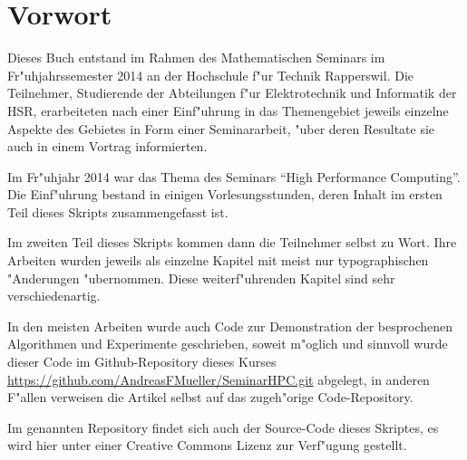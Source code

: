 \chapter*{Vorwort}
Dieses Buch entstand im Rahmen des Mathematischen Seminars
im Fr"uhjahrssemester 2014 an der Hochschule f"ur Technik Rapperswil.
Die Teilnehmer, Studierende der Abteilungen f"ur Elektrotechnik und
Informatik der
HSR, erarbeiteten nach einer Einf"uhrung in das Themengebiet jeweils
einzelne Aspekte des Gebietes in Form einer Seminararbeit, "uber
deren Resultate sie auch in einem Vortrag informierten. 

Im Fr"uhjahr 2014 war das Thema des Seminars ``High Performance Computing''.
Die Einf"uhrung bestand in einigen Vorlesungsstunden, deren
Inhalt im ersten Teil dieses Skripts zusammengefasst ist.

Im zweiten Teil dieses Skripts kommen dann die Teilnehmer
selbst zu Wort. Ihre Arbeiten wurden jeweils als einzelne
Kapitel mit meist nur typographischen "Anderungen "ubernommen.
Diese weiterf"uhrenden Kapitel sind sehr verschiedenartig.

In den meisten Arbeiten wurde auch Code zur Demonstration der 
besprochenen Algorithmen und Experimente geschrieben, soweit
m"oglich und sinnvoll wurde dieser Code im Github-Repository
dieses Kurses \url{https://github.com/AndreasFMueller/SeminarHPC.git}
abgelegt, in anderen F"allen verweisen die Artikel selbst auf
das zugeh"orige Code-Repository.

Im genannten Repository findet sich auch der Source-Code dieses
Skriptes, es wird hier unter einer Creative Commons Lizenz
zur Verf"ugung gestellt.

